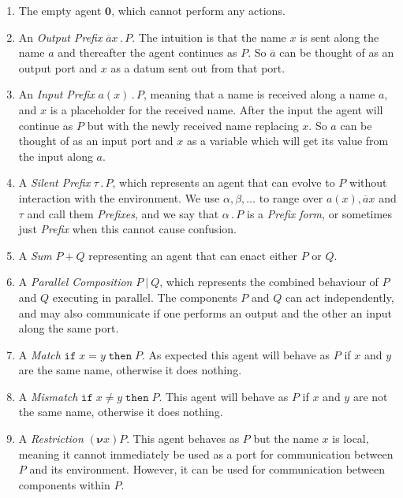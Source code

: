 \documentclass[10pt,a4paper]{article}
\newcommand{\ifthen}[2]{\texttt{if}\;#1\;\texttt{then}\;#2}
\newcommand{\resp}[1]{(\boldsymbol{\nu}#1)}
\newcommand{\res}[2]{\resp{#1}#2}
\newcommand{\nil}{\mathbf{0}}
\newcommand{\outp}[2]{\overline{#1}#2}
\newcommand{\inpp}[2]{#1(#2)}
\newcommand{\silp}{\tau}
\newcommand{\prefix}[2]{{#1}\,.\,#2}
\newcommand{\out}[3]{\prefix{\outp{#1}{#2}}{#3}}
\newcommand{\inp}[3]{\prefix{\inpp{#1}{#2}}{#3}}
\newcommand{\sil}[1]{\prefix{\silp}{#1}}
\newcommand{\para}{\:|\:}
\begin{document}
\begin{enumerate}

\item The empty agent $\nil$, which cannot perform any actions.

\item An \emph{Output Prefix} $\out{a}{x}{P}$. The intuition is that the name $x$ is sent along the name $a$ and thereafter the agent continues as $P$. So $\overline{a}$ can be thought of as an output port and $x$ as a datum sent out from that port.

\item An \emph{Input Prefix} $\inp{a}{x}{P}$, meaning that a name is received along a name $a$, and $x$ is a placeholder for the received name. After the input the agent will continue as $P$ but with the newly received name replacing $x$. So $a$ can be thought of as an input port and $x$ as a variable which will get its value from the input along $a$.

\item A \emph{Silent Prefix} $\sil{P}$, which represents an agent that can evolve to $P$ without interaction with the environment. We use $\alpha, \beta, \dots$ to range over $\inpp{a}{x}, \outp{a}{x}$ and $\silp$ and call them \emph{Prefixes}, and we say that $\prefix{\alpha}{P}$ is a \emph{Prefix form}, or sometimes just \emph{Prefix} when this cannot cause confusion. 

\item A \emph{Sum} $P + Q$ representing an agent that can enact either $P$ or $Q$.

\item A \emph{Parallel Composition} $P \para Q$, which represents the combined behaviour of $P$ and $Q$ executing in parallel. The components $P$ and $Q$ can act independently, and may also communicate if one performs an output and the other an input along the same port.

\item A \emph{Match} $\ifthen{x = y}{P}$. As expected this agent will behave as $P$ if $x$ and $y$ are the same name, otherwise it does nothing.

\item A \emph{Mismatch} $\ifthen{x \neq y}{P}$. This agent will behave as $P$ if $x$ and $y$ are not the same name, otherwise it does nothing.

\item A \emph{Restriction} $\res{x}{P}$. This agent behaves as $P$ but the name $x$ is local, meaning it cannot immediately be used as a port for communication between $P$ and its environment. However, it can be used for communication between components within $P$.


\end{enumerate}
\end{document}
